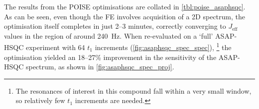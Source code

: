 The results from the POISE optimisations are collated in \cref{tbl:poise_asaphsqc}.
As can be seen, even though the FE involves acquisition of a 2D spectrum, the optimisation itself completes in just 2--3 minutes, correctly converging to $J_\text{eff}$ values in the region of around \SI{240}{\Hz}.
When re-evaluated on a `full' ASAP-HSQC experiment with 64 $t_1$ increments (\cref{fig:asaphsqc_spec_spec}),%
\footnote{The \carbon{} resonances of interest in this compound fall within a very small window, so relatively few $t_1$ increments are needed.}
the optimisation yielded an 18--27\% improvement in the sensitivity of the ASAP-HSQC spectrum, as shown in \cref{fig:asaphsqc_spec_proj}.
